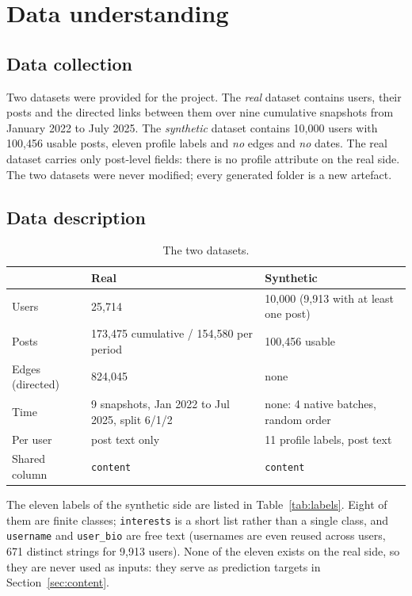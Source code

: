 \documentclass[11pt,a4paper]{article}
\newcommand{\code}[1]{\texttt{\small #1}}
\begin{document}
\section{Data understanding}
\label{sec:data}

\subsection{Data collection}
Two datasets were provided for the project. The \emph{real} dataset contains users, their posts and the
directed links between them over nine cumulative snapshots from January 2022 to July 2025. The
\emph{synthetic} dataset contains 10,000 users with 100,456 usable posts, eleven profile labels and
\emph{no} edges and \emph{no} dates. The real dataset carries only post-level fields: there is no profile
attribute on the real side. The two datasets were never modified; every generated folder is a new
artefact.

\subsection{Data description}
\begin{table}[h]
  \centering
  \small
  \caption{The two datasets.}
  \begin{tabular}{@{}lll@{}}
    \toprule
    & Real & Synthetic \\
    \midrule
    Users & 25,714 & 10,000 (9,913 with at least one post) \\
    Posts & 173,475 cumulative / 154,580 per period & 100,456 usable \\
    Edges (directed) & 824,045 & none \\
    Time & 9 snapshots, Jan 2022 to Jul 2025, split 6/1/2 & none: 4 native batches, random order \\
    Per user & post text only & 11 profile labels, post text \\
    Shared column & \code{content} & \code{content} \\
    \bottomrule
  \end{tabular}
\end{table}

The eleven labels of the synthetic side are listed in Table~\ref{tab:labels}. Eight of them are finite
classes; \code{interests} is a short list rather than a single class, and \code{username} and
\code{user\_bio} are free text (usernames are even reused across users, 671 distinct strings for 9,913
users). None of the eleven exists on the real side, so they are never used as inputs: they serve as
prediction targets in Section~\ref{sec:content}.
\end{document}

